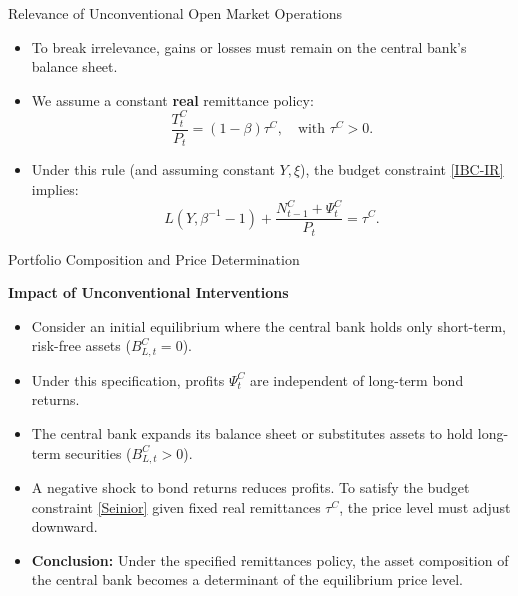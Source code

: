 \documentclass[11pt,aspectratio=169]{beamer}
\begin{document}
\begin{frame}{Relevance of Unconventional Open Market Operations}
\small
\begin{itemize}
    \item To break irrelevance, gains or losses must remain on the central bank's balance sheet.
    \item We assume a constant \textbf{real} remittance policy:
    \begin{equation*}
        \frac{T_{t}^{C}}{P_{t}}=(1-\beta )\tau ^{C}, \quad \text{with } \tau ^{C}>0.
    \end{equation*}
    \item Under this rule (and assuming constant $Y, \xi$), the budget constraint \eqref{IBC-IR} implies:
    \begin{equation}
        L(Y,\beta ^{-1}-1)+\frac{N_{t-1}^{C}+\Psi _{t}^{C}}{P_{t}}=\tau ^{C}. \label{Seinior}
    \end{equation}
\end{itemize}
\end{frame}
\begin{frame}{Portfolio Composition and Price Determination}
\small

\textbf{Impact of Unconventional Interventions}
\begin{itemize}
    \item Consider an initial equilibrium where the central bank  holds only short-term, risk-free assets ($B_{L,t}^{C}=0$).
    \item Under this specification, profits $\Psi_t^C$ are independent of long-term bond returns.
    \item The central bank  expands its balance sheet or substitutes assets to hold long-term securities ($B_{L,t}^{C} > 0$).
    \item A negative shock to bond returns reduces profits. To satisfy the budget constraint \eqref{Seinior} given fixed real remittances $\tau^C$, the price level must adjust downward.
    \item \textbf{Conclusion:} Under the specified remittances policy, the asset composition of the central bank  becomes a determinant of the equilibrium price level.
\end{itemize}
\end{frame}
\end{document}
